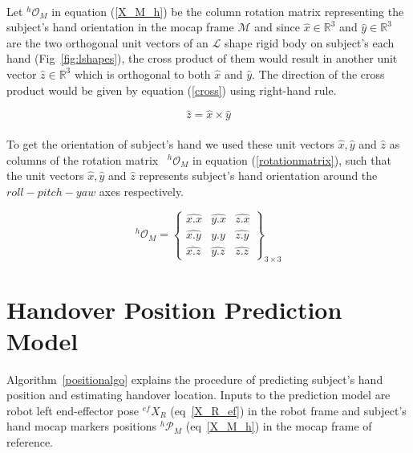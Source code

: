 \paragraph*{}
Let ${}^{h}\mathcal{O}_{M}$ in equation (\ref{X_M_h}) be the column rotation matrix representing the subject's hand orientation in the mocap frame $\mathcal{M}$ and since $\hat{x} \in \mathbb{R}^{3}$ and $\hat{y} \in \mathbb{R}^{3}$ are the two orthogonal unit vectors of an $\mathcal{L}$ shape rigid body on subject's each hand (Fig~\ref{fig:lshapes}), the cross product of them would result in another unit vector $\hat{z} \in \mathbb{R}^{3}$ which is orthogonal to both $\hat{x}$ and $\hat{y}$. The direction of the cross product would be given by equation (\ref{cross}) using right-hand rule.


\begin{equation}\label{cross}
\hat{z} = \hat{x} \times \hat{y}
\end{equation}


\paragraph*{}
To get the orientation of subject's hand we used these unit vectors $\hat{x}, \hat{y}$ and $\hat{z}$ as columns of the rotation matrix~\cite{evans2001rotations, altmann2005rotations, jia2017rotation} ${}^{h}\mathcal{O}_{M}$ in equation (\ref{rotationmatrix}), such that the unit vectors $\hat{x}, \hat{y}$ and $\hat{z}$ represents subject's hand orientation around the $roll-pitch-yaw$ axes respectively.

\begin{equation}\label{rotationmatrix}
{}^{h}\mathcal{O}_{M} = 
\left\{\begin{array}{cccc}
\hat{x.x} & \hat{y.x} & \hat{z.x} \\
\hat{x.y} & \hat{y.y} & \hat{z.y} \\
\hat{x.z} & \hat{y.z} & \hat{z.z}
\end{array}\right\}_{3\times 3}
\end{equation}



\newpage
\section{Handover Position Prediction Model}\label{prediction_model}
Algorithm~\ref{positionalgo} explains the procedure of predicting subject's hand position and estimating handover location. Inputs to the prediction model are robot left end-effector pose $\mathcal{}^{ef}{X}_R$ (eq~\ref{X_R_ef}) in the robot frame and subject's hand mocap markers positions ${}^{h}\mathcal{P}_M$ (eq~\ref{X_M_h}) in the mocap frame of reference.

